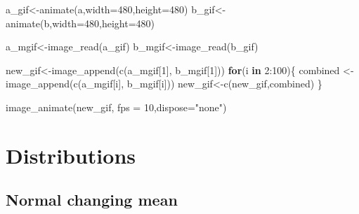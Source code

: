 \documentclass[
  letterpaper,
  DIV=11,
  numbers=noendperiod]{scrreprt}
\newenvironment{Shaded}{\begin{snugshade}}{\end{snugshade}}
\newcommand{\AttributeTok}[1]{\textcolor[rgb]{0.40,0.45,0.13}{#1}}
\newcommand{\ControlFlowTok}[1]{\textcolor[rgb]{0.00,0.23,0.31}{\textbf{#1}}}
\newcommand{\DecValTok}[1]{\textcolor[rgb]{0.68,0.00,0.00}{#1}}
\newcommand{\FunctionTok}[1]{\textcolor[rgb]{0.28,0.35,0.67}{#1}}
\newcommand{\NormalTok}[1]{\textcolor[rgb]{0.00,0.23,0.31}{#1}}
\newcommand{\OtherTok}[1]{\textcolor[rgb]{0.00,0.23,0.31}{#1}}
\newcommand{\SpecialCharTok}[1]{\textcolor[rgb]{0.37,0.37,0.37}{#1}}
\newcommand{\StringTok}[1]{\textcolor[rgb]{0.13,0.47,0.30}{#1}}
\begin{document}
\begin{Shaded}
\begin{Highlighting}[]
\NormalTok{a\_gif}\OtherTok{\textless{}{-}}\FunctionTok{animate}\NormalTok{(a,}\AttributeTok{width=}\DecValTok{480}\NormalTok{,}\AttributeTok{height=}\DecValTok{480}\NormalTok{)}
\NormalTok{b\_gif}\OtherTok{\textless{}{-}}\FunctionTok{animate}\NormalTok{(b,}\AttributeTok{width=}\DecValTok{480}\NormalTok{,}\AttributeTok{height=}\DecValTok{480}\NormalTok{)}

\NormalTok{a\_mgif}\OtherTok{\textless{}{-}}\FunctionTok{image\_read}\NormalTok{(a\_gif)}
\NormalTok{b\_mgif}\OtherTok{\textless{}{-}}\FunctionTok{image\_read}\NormalTok{(b\_gif)}

\NormalTok{new\_gif}\OtherTok{\textless{}{-}}\FunctionTok{image\_append}\NormalTok{(}\FunctionTok{c}\NormalTok{(a\_mgif[}\DecValTok{1}\NormalTok{], b\_mgif[}\DecValTok{1}\NormalTok{]))}
\ControlFlowTok{for}\NormalTok{(i }\ControlFlowTok{in} \DecValTok{2}\SpecialCharTok{:}\DecValTok{100}\NormalTok{)\{}
\NormalTok{  combined }\OtherTok{\textless{}{-}} \FunctionTok{image\_append}\NormalTok{(}\FunctionTok{c}\NormalTok{(a\_mgif[i], b\_mgif[i]))}
\NormalTok{  new\_gif}\OtherTok{\textless{}{-}}\FunctionTok{c}\NormalTok{(new\_gif,combined)}
\NormalTok{\}}

\FunctionTok{image\_animate}\NormalTok{(new\_gif, }\AttributeTok{fps =} \DecValTok{10}\NormalTok{,}\AttributeTok{dispose=}\StringTok{"none"}\NormalTok{)}
\end{Highlighting}
\end{Shaded}

\section{Distributions}\label{distributions}

\subsection{Normal changing mean}\label{normal-changing-mean}
\end{document}
